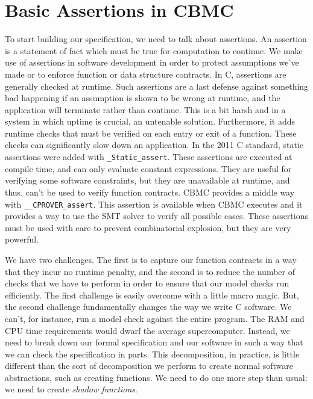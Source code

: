 \section{Basic Assertions in CBMC}

To start building our specification, we need to talk about assertions. An
assertion is a statement of fact which must be true for computation to continue.
We make use of assertions in software development in order to protect
assumptions we've made or to enforce function or data structure contracts. In C,
assertions are generally checked at runtime. Such assertions are a last defense
against something bad happening if an assumption is shown to be wrong at
runtime, and the application will terminate rather than continue. This is a bit
harsh and in a system in which uptime is crucial, an untenable solution.
Furthermore, it adds runtime checks that must be verified on each entry or exit
of a function.  These checks can significantly slow down an application.  In the
2011 C standard, static assertions were added with \verb/_Static_assert/. These
assertions are executed at compile time, and can only evaluate constant
expressions.  They are useful for verifying some software constraints, but they
are unavailable at runtime, and thus, can't be used to verify function
contracts.  CBMC provides a middle way with \verb/__CPROVER_assert/.  This
assertion is available when CBMC executes and it provides a way to use the SMT
solver to verify all possible cases.  These assertions must be used with care to
prevent combinatorial explosion, but they are very powerful.

We have two challenges.  The first is to capture our function contracts in a way
that they incur no runtime penalty, and the second is to reduce the number of
checks that we have to perform in order to ensure that our model checks run
efficiently.  The first challenge is easily overcome with a little macro magic.
But, the second challenge fundamentally changes the way we write C software. We
can't, for instance, run a model check against the entire program.  The RAM and
CPU time requirements would dwarf the average supercomputer.  Instead, we need
to break down our formal specification and our software in such a way that we
can check the specification in parts.  This decomposition, in practice, is
little different than the sort of decomposition we perform to create normal
software abstractions, such as creating functions.  We need to do one more step
than usual: we need to create \emph{shadow functions}.

